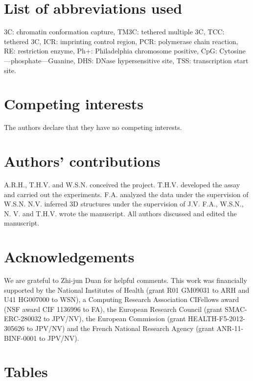 \section*{List of abbreviations used}
3C: chromatin conformation capture, TM3C:  tethered multiple 3C, TCC: tethered
3C, ICR: imprinting control region, PCR: polymerase chain reaction,
RE: restriction enzyme, Ph+: Philadelphia chromosome positive,
CpG: Cytosine---phosphate---Guanine, DHS: DNase hypersensitive site,
TSS: transcription start site.

\section*{Competing interests}
The authors declare that they have no competing interests.

\section*{Authors' contributions}
A.R.H., T.H.V. and W.S.N. conceived the project. T.H.V. developed the assay and
carried out the experiments. F.A. analyzed the data under the supervision of W.S.N.
N.V. inferred 3D structures under the supervision of J.V.  F.A.,  W.S.N., N. V. and
T.H.V. wrote the manuscript. All authors discussed and edited the manuscript.


\section*{Acknowledgements}
We are grateful to Zhi-jun Duan for helpful comments.
This work was financially supported by the National Institutes of Health
(grant R01 GM09031 to ARH and U41 HG007000 to WSN), a Computing Research Association CIFellows
award (NSF award CIF 1136996 to FA), the European Research Council
(grant SMAC-ERC-280032 to JPV/NV), the European Commission
(grant HEALTH-F5-2012-305626 to JPV/NV) and the French National
Research Agency (grant ANR-11-BINF-0001 to JPV/NV).
\lineskip=0pt

\section*{Tables}
